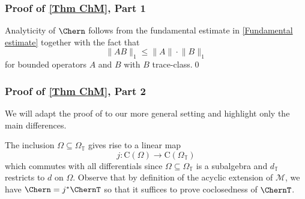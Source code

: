 \documentclass[a4paper, english, 12pt, bibliography=totocnumbered,
index=totoc]{scrartcl}
\begin{document}
\subsubsection{Proof of \texorpdfstring{\cref{Thm ChM}}{Theorem 5.10}, Part 1}
Analyticity of $\Chern$ follows from the fundamental estimate in
\cref{Fundamental estimate} together with the fact that
\begin{equation*}
	\lVert AB \rVert_1 \leq \lVert A \rVert \cdot \lVert B \rVert_1
\end{equation*}
for bounded operators $A$ and $B$ with $B$ trace-class.\qed
\subsubsection{Proof of \texorpdfstring{\cref{Thm ChM}}{Theorem 5.10}, Part 2}
We will adapt the proof of \cite[Theorem 5.3]{GüneysuLudewig} to
our more general setting and highlight only the main differences.

The inclusion $\Omega \subseteq \Omega_{\mathbb{T}}$ gives rise to a linear 
map
\begin{equation*}
	j \colon \mathrm{C}(\Omega) \to \mathrm{C}(\Omega_{\mathbb{T}})
\end{equation*}
which commutes with all differentials since $\Omega \subseteq 
\Omega_{\mathbb{T}}$ is a subalgebra and $d_{\mathbb{T}}$ restricts to $d$ on 
$\Omega$.
Observe that by definition of the acyclic extension of $\mathscr{M}$, we have
$\Chern = j^*\ChernT$ so that it suffices to prove coclosedness of $\ChernT$.
\end{document}
